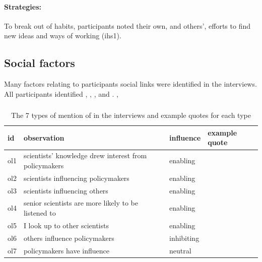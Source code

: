 \paragraph{Strategies:}
To break out of habits, participants noted their own, and others', efforts to find new ideas and ways of working (ihs1).
 
\subsection{Social factors}\label{sec:ressocial}

Many factors relating to participants social links were identified in the interviews. All participants identified \ismso, \ismsi, \ismsr, \ismsm{} and \ismsnr{}. ,  

\subsubsection{\ismso}\label{sec:resopinionleaders}

\begin{table}[!ht]
\footnotesize
\caption{The 7 types of mention of \ismso{} in the interviews and example quotes for each type}\label{tab:resopinionleaders}
\begin{tabular}{L{.06\linewidth}L{.3\linewidth}L{.12\linewidth}L{.52\linewidth}} \hline 
\textbf{id} & \textbf{observation} & \textbf{influence} & \textbf{example quote} \\ \hline \hline 
ol1 & scientists' knowledge   drew interest from policymakers & enabling &   \\[5mm]
ol2 & scientists influencing policymakers & enabling &   \\[5mm]
ol3 & scientists influencing others & enabling &  \\[5mm]
ol4 & senior scientists are more likely to be   listened to & enabling &  \\[5mm]
ol5 & I look up to other scientists & enabling &  \\[5mm]
ol6 & others influence policymakers & inhibiting &  \\[5mm]
ol7 & policymakers have influence & neutral &  \\[5mm] \hline
\end{tabular}
\end{table}

